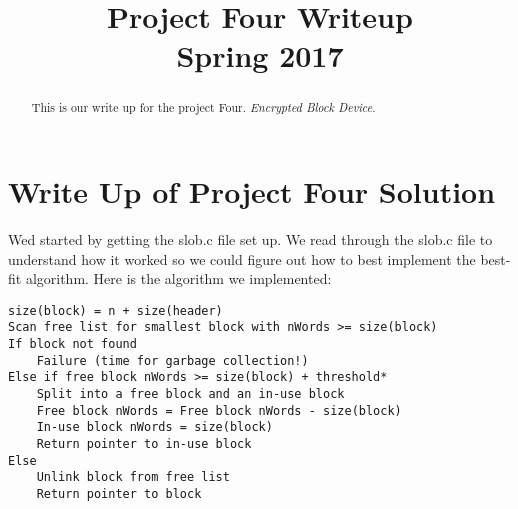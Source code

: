 
\usepackage[T1]{fontenc}
\usepackage{geometry}
\usepackage{listings}
\geometry{textwidth=10cm}
\sffamily

\title{
	Project Four Writeup \\
    {
    	\LARGE Spring 2017 
    }
}
\author{
}



\maketitle
\begin{abstract}
  This is our write up for the project Four. \textit{Encrypted Block Device}.
\end{abstract}

\clearpage

\section{Write Up of Project Four Solution} Wed started by getting the slob.c file set up. We read through the slob.c file to understand how it worked so we could figure out how to best implement the best-fit algorithm. Here is the algorithm we implemented: 
\begin{lstlisting} 
size(block) = n + size(header) 
Scan free list for smallest block with nWords >= size(block) 
If block not found 
    Failure (time for garbage collection!) 
Else if free block nWords >= size(block) + threshold* 
    Split into a free block and an in-use block 
    Free block nWords = Free block nWords - size(block) 
    In-use block nWords = size(block) 
    Return pointer to in-use block 
Else 
    Unlink block from free list 
    Return pointer to block
\end{lstlisting}   

